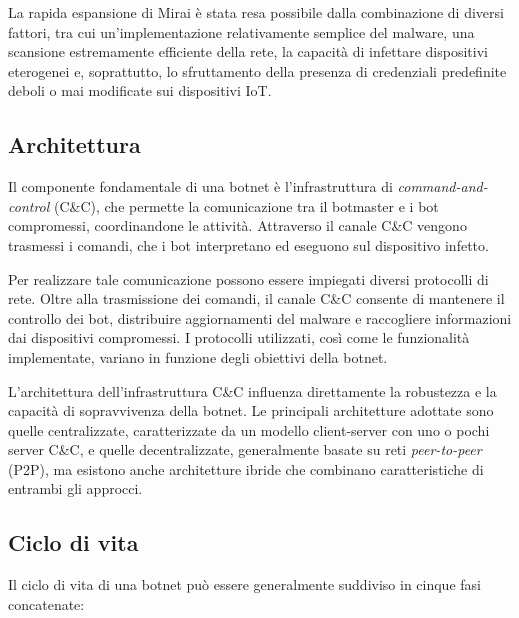 La rapida espansione di Mirai è stata resa possibile dalla combinazione di diversi fattori, tra cui un'implementazione relativamente semplice del malware, una scansione estremamente efficiente della rete, la capacità di infettare dispositivi eterogenei e, soprattutto, lo sfruttamento della presenza di credenziali predefinite deboli o mai modificate sui dispositivi IoT. \cite{antonakakis2017mirai}

\subsection{Architettura} %

Il componente fondamentale di una botnet è l'infrastruttura di \textit{command-and-control} (C\&C), che permette la comunicazione tra il botmaster e i bot compromessi, coordinandone le attività. Attraverso il canale C\&C vengono trasmessi i comandi, che i bot interpretano ed eseguono sul dispositivo infetto.

Per realizzare tale comunicazione possono essere impiegati diversi protocolli di rete. Oltre alla trasmissione dei comandi, il canale C\&C consente di mantenere il controllo dei bot, distribuire aggiornamenti del malware e raccogliere informazioni dai dispositivi compromessi. I protocolli utilizzati, così come le funzionalità implementate, variano in funzione degli obiettivi della botnet.

L'architettura dell'infrastruttura C\&C influenza direttamente la robustezza e la capacità di sopravvivenza della botnet. Le principali architetture adottate sono quelle centralizzate, caratterizzate da un modello client-server con uno o pochi server C\&C, e quelle decentralizzate, generalmente basate su reti \textit{peer-to-peer} (P2P), ma esistono anche architetture ibride che combinano caratteristiche di entrambi gli approcci.

\subsection{Ciclo di vita} %

Il ciclo di vita di una botnet può essere generalmente suddiviso in cinque fasi concatenate:


